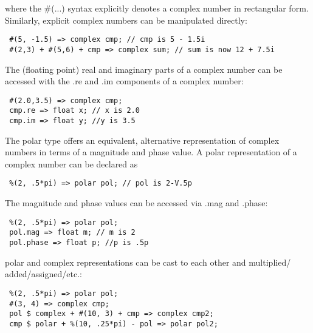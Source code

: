 where the \#(...) syntax explicitly denotes a complex number in rectangular
form. Similarly, explicit complex numbers can be manipulated directly:

\begin{verbatim}
 #(5, -1.5) => complex cmp; // cmp is 5 - 1.5i
 #(2,3) + #(5,6) + cmp => complex sum; // sum is now 12 + 7.5i
\end{verbatim}

The (floating point) real and imaginary parts of a complex number can be
accessed with the .re and .im components of a complex number:

\begin{verbatim}
 #(2.0,3.5) => complex cmp;
 cmp.re => float x; // x is 2.0
 cmp.im => float y; //y is 3.5
\end{verbatim}

The polar type offers an equivalent, alternative representation of complex
numbers in terms of a magnitude and phase value. A polar representation of a
complex number can be declared as

\begin{verbatim}
 %(2, .5*pi) => polar pol; // pol is 2-V.5p
\end{verbatim}

The magnitude and phase values can be accessed via .mag and .phase:

\begin{verbatim}
 %(2, .5*pi) => polar pol;
 pol.mag => float m; // m is 2
 pol.phase => float p; //p is .5p
\end{verbatim}

polar and complex representations can be cast to each other and multiplied/
added/assigned/etc.:

\begin{verbatim}
 %(2, .5*pi) => polar pol;
 #(3, 4) => complex cmp;
 pol $ complex + #(10, 3) + cmp => complex cmp2;
 cmp $ polar + %(10, .25*pi) - pol => polar pol2;
\end{verbatim}
